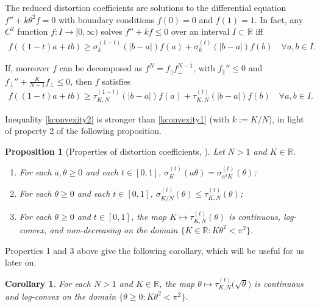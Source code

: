 \documentclass{article}
\newcommand{\R}{\mathbb{R}}
\newtheorem{prop}[theorem]{Proposition}
\newtheorem{corollary}[theorem]{Corollary}
\theoremstyle{definition}
\begin{document}
{The reduced distortion coefficients are solutions to the differential equation $f''+k\theta^2f=0$ with boundary conditions $f(0)=0$ and $f(1)=1$. In fact, any $C^2$ function $f:I\to [0,\infty)$ solves $f''+kf\leq 0$ over an interval $I\subset \R$ iff 
\begin{align}\label{kconvexity1}
f((1-t)a+tb)\geq \sigma^{(1-t)}_k(|b-a|)f(a)+\sigma_k^{(t)}(|b-a|)f(b)\quad \forall a,b\in I.
\end{align}

If, moreover $f$ can be decomposed as $f^N=f_\|f_\perp^{N-1}$, with $f_\|''\leq 0$ and $f_\perp''+\frac{K}{N-1}f_\perp\leq0$, then $f$ satisfies 
\begin{align}\label{kconvexity2}
f((1-t)a+tb)\geq \tau^{(1-t)}_{K,N}(|b-a|)f(a)+\tau_{K,N}^{(t)}(|b-a|)f(b)\quad \forall a,b\in I.
\end{align}

Inequality \eqref{kconvexity2} is stronger than \eqref{kconvexity1} (with $k:=K/N$), in light of property 2 of the following proposition.
\begin{prop}[Properties of distortion coefficients, ]
Let $N> 1$ and $K\in \R$. 
\begin{enumerate}
\item For each $a,\theta\geq 0$ and each $t\in [0,1]$, $\sigma_{K}^{(t)}(a\theta)= \sigma_{a^2K}^{(t)}(\theta)$; 
\item For each $\theta\geq 0$ and each $t\in[0,1]$, $\sigma_{K/N}^{(t)}(\theta)\leq \tau_{K,N}^{(t)}(\theta)$;
\item For each $\theta\geq 0$ and $t\in[0,1]$, the map $K\mapsto \tau_{K,N}^{(t)}(\theta)$ is continuous, log-convex, and non-decreasing on the domain $\{K\in \R: K\theta^2<\pi^2\}$.
\end{enumerate}
\end{prop}

Properties 1 and 3 above give the following corollary, which will be useful for us later on. 
\begin{corollary}\label{logconvexityoftau}
For each $N>1$ and $K\in \R$, the map $\theta\mapsto \tau_{K,N}^{(t)}\big(\sqrt\theta\big)$ is continuous and log-convex on the domain $\{\theta\geq 0: K\theta^2<\pi^2\}$.
\end{corollary}
}
\end{document}
